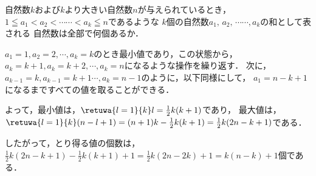
\begin{problem}
  自然数$k$および$k$より大きい自然数$n$が与えられているとき，
$1\leqq a_1<a_2<\cdots\cdots<a_k \leqq n$であるような
$k$個の自然数$a_1, \, a_2, \, \cdots\cdots, a_k$の和として表される
自然数は全部で何個あるか．
\end{problem}

$a_1 = 1, a_2 = 2, \cdots, a_k = k$のとき最小値であり，この状態から，
$a_k = k+1, a_k = k+2, \cdots, a_k = n$になるような操作を繰り返す．
次に，$a_{k-1} = k, a_{k-1} = k+1 \cdots, a_k = n-1$のように，以下同様にして，
$a_1 = n - k + 1$になるまですべての値を取ることができる．

よって，最小値は，$\retuwa{l=1}{k}l = \frac12 k(k+1)$であり，
最大値は，$\retuwa{l=1}{k}(n-l+1) = (n+1)k - \frac12 k(k+1) = \frac12 k (2n-k+1)$である．

したがって，とり得る値の個数は，
$\frac12 k(2n-k+1) - \frac12 k(k+1) + 1 = \frac12 k(2n-2k)+1 = k(n-k)+1$個である．
